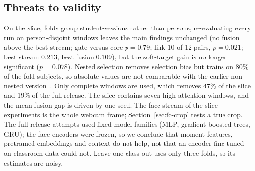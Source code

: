 \subsection{Threats to validity}
\label{sec:threats}
On the slice, folds group student-sessions rather than persons; re-evaluating every run on person-disjoint windows leaves the main findings unchanged (no fusion above the best stream; gate versus core $p=0.79$; link 10 of 12 pairs, $p=0.021$; best stream $0.213$, best fusion $0.109$), but the soft-target gain is no longer significant ($p=0.078$). Nested selection removes selection bias but trains on 80\% of the fold subjects, so absolute values are not comparable with the earlier non-nested version~\cite{cawley2010overfitting}. Only complete windows are used, which removes 47\% of the slice and 19\% of the full release. The slice contains seven high-attention windows, and the mean fusion gap is driven by one seed. The face stream of the slice experiments is the whole webcam frame; Section~\ref{sec:fc-crop} tests a true crop. The full-release attempts used fixed model families (MLP, gradient-boosted trees, GRU); the face encoders were frozen, so we conclude that moment features, pretrained embeddings and context do not help, not that an encoder fine-tuned on classroom data could not. Leave-one-class-out uses only three folds, so its estimates are noisy.
